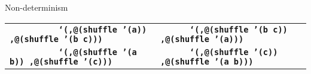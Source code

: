 


\begin{frame}{Non-determinism}
  \tiny
  \begin{tabularx}{\textwidth}{ X X }
    \texttt{\ \newline
      \ \newline
      \ \newline
      \ \newline
      \ \newline
      \hphantom{\_\_\_\_\_}\textbf{`(,@(shuffle '(a))\newline
      \hphantom{\_\_\_\_\_\_\_},@(shuffle '(b c)))}\newline
      \ 
    }
    &
    \texttt{\ \newline
      \ \newline
      \ \newline
      \hphantom{\_\_\_\_\_\_}\textbf{`(,@(shuffle '(b c))\newline
      \hphantom{\_\_\_\_\_\_\_\_},@(shuffle '(a)))}\newline
      \ \newline
      \ \newline
      \ 
    }

    \\

    \texttt{\ \newline
      \ \newline
      \ \newline
      \ \newline
      \ \newline
      \hphantom{\_\_\_\_\_}\textbf{`(,@(shuffle '(a b))\newline
      \hphantom{\_\_\_\_\_\_\_},@(shuffle '(c)))}\newline
      \ 
    }
    &
    \texttt{\ \newline
      \ \newline
      \ \newline
      \hphantom{\_\_\_\_\_\_}\textbf{`(,@(shuffle '(c))\newline
      \hphantom{\_\_\_\_\_\_\_\_},@(shuffle '(a b)))}\newline
      \ \newline
      \ \newline
      \ 
    }

  \end{tabularx}
\end{frame}



